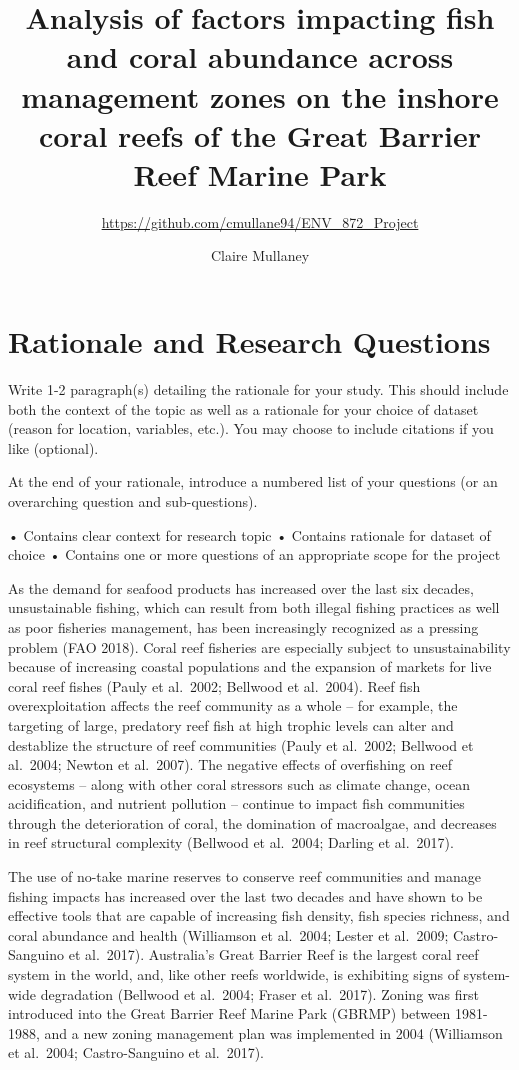 \documentclass[12pt,]{article}
\title{Analysis of factors impacting fish and coral abundance across management
zones on the inshore coral reefs of the Great Barrier Reef Marine Park}
\subtitle{\url{https://github.com/cmullane94/ENV_872_Project}}
\author{Claire Mullaney}
\date{}
\begin{document}
\maketitle

\newpage
\tableofcontents 
\newpage
\listoftables 
\newpage
\listoffigures 
\newpage

\hypertarget{rationale-and-research-questions}{%
\section{Rationale and Research
Questions}\label{rationale-and-research-questions}}

Write 1-2 paragraph(s) detailing the rationale for your study. This
should include both the context of the topic as well as a rationale for
your choice of dataset (reason for location, variables, etc.). You may
choose to include citations if you like (optional).

At the end of your rationale, introduce a numbered list of your
questions (or an overarching question and sub-questions).

• Contains clear context for research topic • Contains rationale for
dataset of choice • Contains one or more questions of an appropriate
scope for the project

As the demand for seafood products has increased over the last six
decades, unsustainable fishing, which can result from both illegal
fishing practices as well as poor fisheries management, has been
increasingly recognized as a pressing problem (FAO 2018). Coral reef
fisheries are especially subject to unsustainability because of
increasing coastal populations and the expansion of markets for live
coral reef fishes (Pauly et al.~2002; Bellwood et al.~2004). Reef fish
overexploitation affects the reef community as a whole -- for example,
the targeting of large, predatory reef fish at high trophic levels can
alter and destablize the structure of reef communities (Pauly et
al.~2002; Bellwood et al.~2004; Newton et al.~2007). The negative
effects of overfishing on reef ecosystems -- along with other coral
stressors such as climate change, ocean acidification, and nutrient
pollution -- continue to impact fish communities through the
deterioration of coral, the domination of macroalgae, and decreases in
reef structural complexity (Bellwood et al.~2004; Darling et al.~2017).

The use of no-take marine reserves to conserve reef communities and
manage fishing impacts has increased over the last two decades and have
shown to be effective tools that are capable of increasing fish density,
fish species richness, and coral abundance and health (Williamson et
al.~2004; Lester et al.~2009; Castro-Sanguino et al.~2017). Australia's
Great Barrier Reef is the largest coral reef system in the world, and,
like other reefs worldwide, is exhibiting signs of system-wide
degradation (Bellwood et al.~2004; Fraser et al.~2017). Zoning was first
introduced into the Great Barrier Reef Marine Park (GBRMP) between
1981-1988, and a new zoning management plan was implemented in 2004
(Williamson et al.~2004; Castro-Sanguino et al.~2017).
\end{document}

